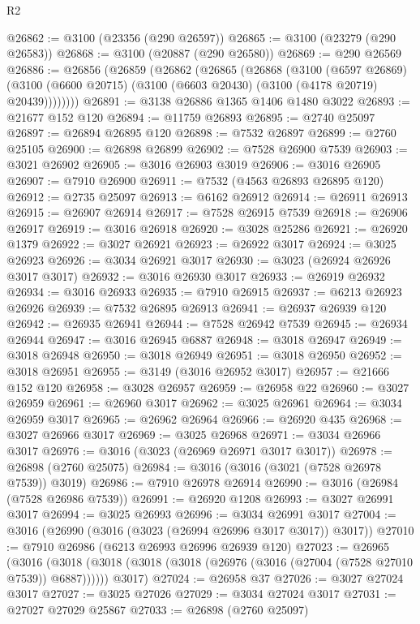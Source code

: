 \begin{lexlean}{R2}
\begin{coremodule}
@26862 := @3100 (@23356 (@290 @26597))
@26865 := @3100 (@23279 (@290 @26583))
@26868 := @3100 (@20887 (@290 @26580))
@26869 := @290 @26569
@26886 := @26856
    (@26859
      (@26862
        (@26865
          (@26868
            (@3100
              (@6597 @26869)
              (@3100 (@6600 @20715) (@3100 (@6603 @20430) (@3100 (@4178 @20719) @20439))))))))
@26891 := @3138 @26886 @1365 @1406 @1480 @3022
@26893 := @21677 @152 @120
@26894 := @11759 @26893
@26895 := @2740 @25097
@26897 := @26894 @26895 @120
@26898 := @7532 @26897
@26899 := @2760 @25105
@26900 := @26898 @26899
@26902 := @7528 @26900 @7539
@26903 := @3021 @26902
@26905 := @3016 @26903 @3019
@26906 := @3016 @26905
@26907 := @7910 @26900
@26911 := @7532 (@4563 @26893 @26895 @120)
@26912 := @2735 @25097
@26913 := @6162 @26912
@26914 := @26911 @26913
@26915 := @26907 @26914
@26917 := @7528 @26915 @7539
@26918 := @26906 @26917
@26919 := @3016 @26918
@26920 := @3028 @25286
@26921 := @26920 @1379
@26922 := @3027 @26921
@26923 := @26922 @3017
@26924 := @3025 @26923
@26926 := @3034 @26921 @3017
@26930 := @3023 (@26924 @26926 @3017 @3017)
@26932 := @3016 @26930 @3017
@26933 := @26919 @26932
@26934 := @3016 @26933
@26935 := @7910 @26915
@26937 := @6213 @26923 @26926
@26939 := @7532 @26895 @26913
@26941 := @26937 @26939 @120
@26942 := @26935 @26941
@26944 := @7528 @26942 @7539
@26945 := @26934 @26944
@26947 := @3016 @26945 @6887
@26948 := @3018 @26947
@26949 := @3018 @26948
@26950 := @3018 @26949
@26951 := @3018 @26950
@26952 := @3018 @26951
@26955 := @3149 (@3016 @26952 @3017)
@26957 := @21666 @152 @120
@26958 := @3028 @26957
@26959 := @26958 @22
@26960 := @3027 @26959
@26961 := @26960 @3017
@26962 := @3025 @26961
@26964 := @3034 @26959 @3017
@26965 := @26962 @26964
@26966 := @26920 @435
@26968 := @3027 @26966 @3017
@26969 := @3025 @26968
@26971 := @3034 @26966 @3017
@26976 := @3016 (@3023 (@26969 @26971 @3017 @3017))
@26978 := @26898 (@2760 @25075)
@26984 := @3016 (@3016 (@3021 (@7528 @26978 @7539)) @3019)
@26986 := @7910 @26978 @26914
@26990 := @3016 (@26984 (@7528 @26986 @7539))
@26991 := @26920 @1208
@26993 := @3027 @26991 @3017
@26994 := @3025 @26993
@26996 := @3034 @26991 @3017
@27004 := @3016 (@26990 (@3016 (@3023 (@26994 @26996 @3017 @3017)) @3017))
@27010 := @7910 @26986 (@6213 @26993 @26996 @26939 @120)
@27023 := @26965
    (@3016
      (@3018 (@3018 (@3018 (@3018 (@26976 (@3016 (@27004 (@7528 @27010 @7539)) @6887))))))
      @3017)
@27024 := @26958 @37
@27026 := @3027 @27024 @3017
@27027 := @3025 @27026
@27029 := @3034 @27024 @3017
@27031 := @27027 @27029 @25867
@27033 := @26898 (@2760 @25097)

\end{coremodule}
\end{lexlean}
